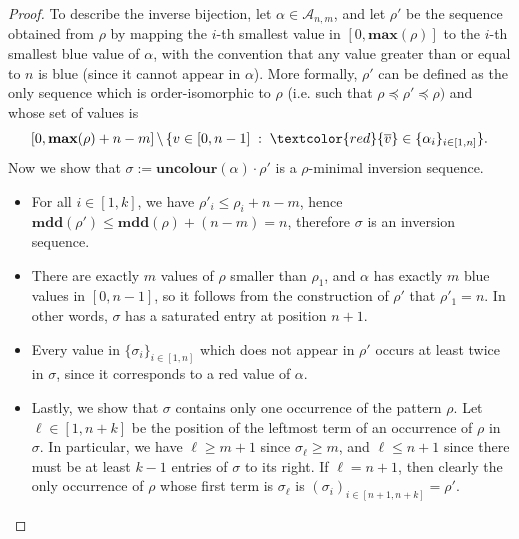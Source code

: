 \documentclass[a4paper,11pt]{article}
\theoremstyle{definition}
\theoremstyle{remark}
\renewcommand{\max}{\mathbf{max}}
\newcommand{\mdd}{\mathbf{mdd}}
\newcommand{\uncolour}{\mathbf{uncolour}}
\newcommand{\tc}{\textcolor}
\renewcommand{\r}[1]{\tc{red}{\overline{#1}}}
\begin{document}
\begin{proof}
    To describe the inverse bijection, let $\alpha \in \mathcal A_{n,m}$, and let $\rho'$ be the sequence obtained from $\rho$ by mapping the $i$-th smallest value in $[0,\max(\rho)]$ to the $i$-th smallest blue value of $\alpha$, with the convention that any value greater than or equal to $n$ is blue (since it cannot appear in $\alpha$). More formally, $\rho'$ can be defined as the only sequence which is order-isomorphic to $\rho$ (i.e. such that $\rho \preceq \rho' \preceq \rho)$ and whose set of values is 
    $$[0,\max(\rho)+n-m] \, \backslash \, \{v \in [0,n-1] \; : \; \r v \in \{\alpha_i\}_{i \in [1,n]}\}.$$
    Now we show that $\sigma := \uncolour({\alpha}) \cdot \rho'$ is a $\rho$-minimal inversion sequence.
    \begin{itemize}
        \item For all $i \in [1,k]$, we have $\rho'_i \leq \rho_i + n-m$, hence $\mdd(\rho') \leq \mdd(\rho) + (n-m) = n$, therefore $\sigma$ is an inversion sequence. 
        \item There are exactly $m$ values of $\rho$ smaller than $\rho_1$, and $\alpha$ has exactly $m$ blue values in $[0,n-1]$, so it follows from the construction of $\rho'$ that $\rho'_1 = n$. In other words, $\sigma$ has a saturated entry at position $n+1$.
        \item Every value in $\{\sigma_{i}\}_{i \in [1,n]}$ which does not appear in $\rho'$ occurs at least twice in $\sigma$, since it corresponds to a red value of $\alpha$.
        \item Lastly, we show that $\sigma$ contains only one occurrence of the pattern $\rho$. Let $\ell \in [1,n+k]$ be the position of the leftmost term of an occurrence of $\rho$ in $\sigma$. In particular, we have $\ell \geq m+1$ since $\sigma_\ell \geq m$, and $\ell \leq n+1$ since there must be at least $k-1$ entries of $\sigma$ to its right. If $\ell = n+1$, then clearly the only occurrence of $\rho$ whose first term is $\sigma_\ell$ is $(\sigma_i)_{i \in [n+1,n+k]} = \rho'$.
        

\end{itemize}
\end{proof}
\end{document}
